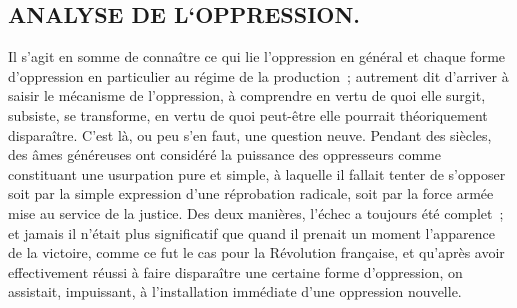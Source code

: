\documentclass[french,twoside]{book} %
\begin{document}
\subsection[{ANALYSE DE L‘OPPRESSION.}]{ANALYSE DE L‘OPPRESSION.}
\noindent Il s'agit en somme de connaître ce qui lie l'oppression en général et chaque forme d'oppression en particulier au régime de la production ; autrement dit d'arriver à saisir le mécanisme de l'oppression, à comprendre en vertu de quoi elle surgit, subsiste, se transforme, en vertu de quoi peut-être elle pourrait théoriquement disparaître. C'est là, ou peu s'en faut, une question neuve. Pendant des siècles, des âmes généreuses ont considéré la puissance des oppresseurs comme constituant une usurpation pure et simple, à laquelle il fallait tenter de s'opposer soit par la simple expression d'une réprobation radicale, soit par la force armée mise au service de la justice. Des deux manières, l'échec a toujours été complet ; et jamais il n'était plus significatif que quand il prenait un moment l'apparence de la victoire, comme ce fut le cas pour la Révolution française, et qu'après avoir effectivement réussi à faire disparaître une certaine forme d'oppression, on assistait, impuissant, à l'installation immédiate d'une oppression nouvelle.\par
\end{document}
